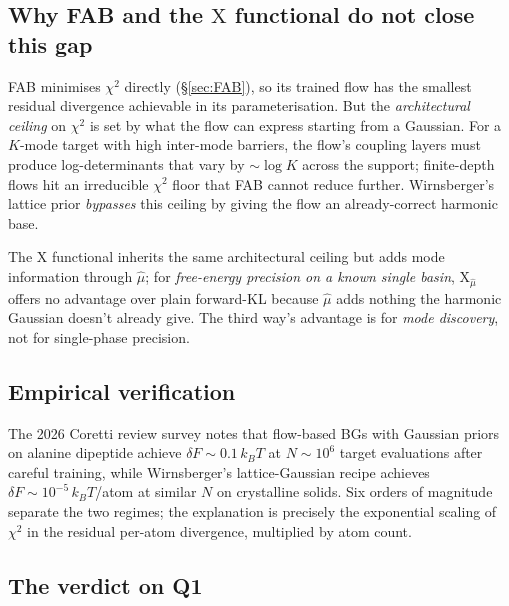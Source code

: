 \documentclass[11pt,letterpaper]{article}
\theoremstyle{plain}
\begin{document}
\subsection{Why FAB and the $\mathrm{X}$ functional do not close this gap}

FAB minimises $\chi^2$ directly (\S\ref{sec:FAB}), so its trained flow has the
smallest residual divergence achievable in its parameterisation. But the
\emph{architectural ceiling} on $\chi^2$ is set by what the flow can express
starting from a Gaussian. For a $K$-mode target with high inter-mode barriers,
the flow's coupling layers must produce log-determinants that vary by
$\sim\log K$ across the support; finite-depth flows hit an irreducible
$\chi^2$ floor that FAB cannot reduce further. Wirnsberger's lattice prior
\emph{bypasses} this ceiling by giving the flow an already-correct harmonic
base.

The $\mathrm{X}$ functional inherits the same architectural ceiling but adds
mode information through $\hat\mu$; for \emph{free-energy precision on a known
single basin}, $\mathrm{X}_{\hat\mu}$ offers no advantage over plain forward-KL
because $\hat\mu$ adds nothing the harmonic Gaussian doesn't already give. The
third way's advantage is for \emph{mode discovery}, not for single-phase
precision.

\subsection{Empirical verification}

The 2026 Coretti review survey notes that flow-based BGs with Gaussian priors
on alanine dipeptide achieve $\delta F \sim 0.1\,k_BT$ at $N\sim 10^6$ target
evaluations after careful training, while Wirnsberger's lattice-Gaussian
recipe achieves $\delta F \sim 10^{-5}\,k_BT$/atom at similar $N$ on
crystalline solids. Six orders of magnitude separate the two regimes; the
explanation is precisely the exponential scaling of $\chi^2$ in the residual
per-atom divergence, multiplied by atom count.

\subsection{The verdict on Q1}
\end{document}
